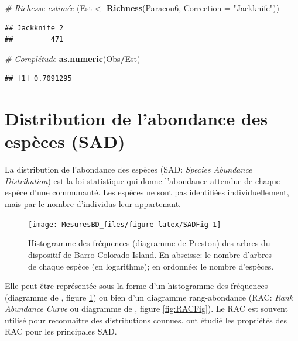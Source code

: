 \documentclass[
  11pt,
  french,
  a4paper,
  extrafontsizes,onecolumn,openright
  ]{memoir}
\newenvironment{Shaded}{\begin{snugshade}}{\end{snugshade}}
\newcommand{\AttributeTok}[1]{\textcolor[rgb]{0.13,0.29,0.53}{#1}}
\newcommand{\CommentTok}[1]{\textcolor[rgb]{0.56,0.35,0.01}{\textit{#1}}}
\newcommand{\FunctionTok}[1]{\textcolor[rgb]{0.13,0.29,0.53}{\textbf{#1}}}
\newcommand{\NormalTok}[1]{#1}
\newcommand{\OtherTok}[1]{\textcolor[rgb]{0.56,0.35,0.01}{#1}}
\newcommand{\SpecialCharTok}[1]{\textcolor[rgb]{0.81,0.36,0.00}{\textbf{#1}}}
\newcommand{\StringTok}[1]{\textcolor[rgb]{0.31,0.60,0.02}{#1}}
\begin{document}
\begin{Shaded}
\begin{Highlighting}[]
\CommentTok{\# Richesse estimée}
\NormalTok{(Est }\OtherTok{\textless{}{-}} \FunctionTok{Richness}\NormalTok{(Paracou6, }\AttributeTok{Correction =} \StringTok{"Jackknife"}\NormalTok{))}
\end{Highlighting}
\end{Shaded}

\begin{verbatim}
## Jackknife 2 
##         471
\end{verbatim}

\begin{Shaded}
\begin{Highlighting}[]
\CommentTok{\# Complétude}
\FunctionTok{as.numeric}\NormalTok{(Obs}\SpecialCharTok{/}\NormalTok{Est)}
\end{Highlighting}
\end{Shaded}

\begin{verbatim}
## [1] 0.7091295
\end{verbatim}

\normalsize

\section{Distribution de l'abondance des espèces (SAD)}\label{distribution-de-labondance-des-espuxe8ces-sad}

La distribution de l'abondance des espèces (SAD: \emph{Species Abundance Distribution}) est la loi statistique qui donne l'abondance attendue de chaque espèce d'une communauté.
Les espèces ne sont pas identifiées individuellement, mais par le nombre d'individus leur appartenant.



\scriptsize

\begin{figure}

{\centering \texttt{[image: MesuresBD\_files/figure-latex/SADFig-1]} 

}

\caption{Histogramme des fréquences (diagramme de Preston) des arbres du dispositif de Barro Colorado Island. En abscisse: le nombre d'arbres de chaque espèce (en logarithme); en ordonnée: le nombre d'espèces.}\label{fig:SADFig}
\end{figure}

\normalsize

Elle peut être représentée sous la forme d'un histogramme des fréquences (diagramme de \textcite{Preston1948}, figure \ref{fig:SADFig}) ou bien d'un diagramme rang-abondance (RAC: \emph{Rank Abundance Curve} ou diagramme de \textcite{Whittaker1965}, figure \ref{fig:RACFig}).
Le RAC est souvent utilisé pour reconnaître des distributions connues.
\textcite{Izsak2012} ont étudié les propriétés des RAC pour les principales SAD.
\end{document}
